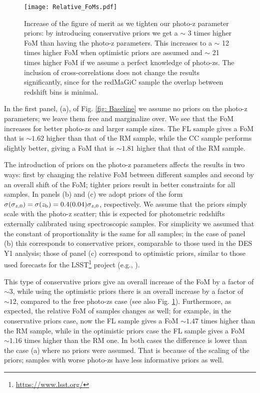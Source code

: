 \documentclass[a4paper,fleqn,usenatbib]{mnras}
\begin{document}
\begin{figure}
\centering
\texttt{[image: Relative\_FoMs.pdf]} 
\caption{Increase of the figure of merit as we tighten our photo-z parameter priors: by introducing conservative priors we get a $\sim$ 3 times higher FoM than having the photo-z parameters. This increases to a $\sim$ 12 times higher FoM when optimistic priors are assumed and $\sim$ 21 times higher FoM if we assume a perfect knowledge of photo-zs. The inclusion of cross-correlations does not change the results significantly, since for the redMaGiC sample the overlap between redshift bins is minimal.}
\label{fig: Norm_increase}
\end{figure}

In the first panel, (a), of Fig. \ref{fig: Baseline} we assume no priors on the photo-z parameters; we leave them free and marginalize over. We see that the FoM increases for better photo-zs and larger sample sizes. The FL sample gives a FoM that is $\sim 1.62$ higher than that of the RM sample, while the CC sample performs slightly better, giving a FoM that is $\sim 1.81$ higher that that of the RM sample.

The introduction of priors on the photo-z parameters affects the results in two ways: first by changing the relative FoM between different samples and second by an overall shift of the FoM; tighter priors result in better constraints for all samples. In panels (b) and (c) we adopt priors of the form $\sigma(\sigma_{z,0}) = \sigma(z_{\mbox{\scriptsize{b}}}) = 0.4(0.04)\sigma_{z,0}$, respectively. We assume that the priors simply scale with the photo-z scatter; this is expected for photometric redshifts externally calibrated using spectroscopic samples. For simplicity we assumed that the constant of proportionality is the same for all samples; in the case of panel (b) this corresponds to conservative priors, comparable to those used in the DES Y1 analysis; those of panel (c) correspond to optimistic priors, similar to those used forecasts for the LSST\footnote{\url{https://www.lsst.org/}} project (e.g., \citealt{Schaan2017}).

This type of conservative priors give an overall increase of the FoM by a factor of $\sim 3$, while using the optimistic priors there is an overall increase by a factor of $\sim 12$, compared to the free photo-zs case (see also Fig. \ref{fig: Norm_increase}). Furthermore, as expected, the relative FoM of samples changes as well; for example, in the conservative priors case, now the FL sample gives a FoM $\sim 1.47$ times higher than the RM sample, while in the optimistic priors case the FL sample gives a FoM $\sim 1.16$ times higher than the RM one. In both cases the difference is lower than the case (a) where no priors were assumed. That is because of the scaling of the priors; samples with worse photo-zs have less informative priors as well.
\end{document}
